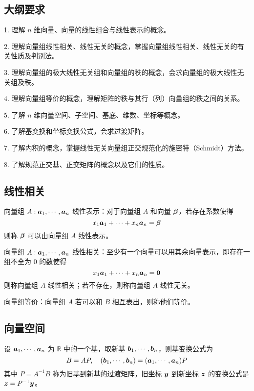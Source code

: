 \subsection{大纲要求}

1. 理解 $n$ 维向量、向量的线性组合与线性表示的概念。

2. 理解向量组线性相关、线性无关的概念，掌握向量组线性相关、线性无关的有关性质及判别法。

3. 理解向量组的极大线性无关组和向量组的秩的概念，会求向量组的极大线性无关组及秩。

4. 理解向量组等价的概念，理解矩阵的秩与其行（列）向量组的秩之间的关系。

5. 了解 $n$ 维向量空间、子空间、基底、维数、坐标等概念。

6. 了解基变换和坐标变换公式，会求过渡矩阵。

7. 了解内积的概念，掌握线性无关向量组正交规范化的施密特（Schmidt）方法。

8. 了解规范正交基、正交矩阵的概念以及它们的性质。

\subsection{线性相关}

向量组 $A: \boldsymbol{a}_1,\cdots,\boldsymbol{a}_n$ 线性表示：对于向量组 $A$ 和向量 $\boldsymbol{\beta}$，若存在系数使得
\[ x_1 \boldsymbol{a}_1 + \cdots + x_n \boldsymbol{a}_n = \boldsymbol{\beta} \]
则称 $\boldsymbol{\beta}$ 可以由向量组 $A$ 线性表示。

向量组 $A: \boldsymbol{a}_1,\cdots,\boldsymbol{a}_n$ 线性相关：至少有一个向量可以用其余向量表示，即存在一组不全为 $0$ 的数使得
\[ x_1 \boldsymbol{a}_1 + \cdots + x_n \boldsymbol{a}_n = \boldsymbol{0} \]
则称向量组 $A$ 线性相关；若不存在，则称向量组 $A$ 线性无关。

向量组等价：向量组 $A$ 若可以和 $B$ 相互表出，则称他们等价。

\subsection{向量空间}

设 $\boldsymbol{a}_1,\cdots,\boldsymbol{a}_n$ 为 $\mathbb{R}$ 中的一个基，取新基 $\boldsymbol{b}_1,\cdots,\boldsymbol{b}_n$，则基变换公式为
\[ B=AP, \quad (\boldsymbol{b}_1,\cdots,\boldsymbol{b}_n) =  (\boldsymbol{a}_1,\cdots,\boldsymbol{a}_n)P \]
其中 $P = A^{-1} B$ 称为旧基到新基的过渡矩阵，旧坐标 $\boldsymbol{y}$ 到新坐标 $\boldsymbol{z}$ 的变换公式是 $\boldsymbol{z} = P^{-1} \boldsymbol{y}$。


